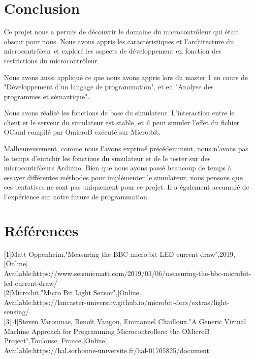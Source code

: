 \documentclass[14px]{article}
\begin{document}
	
	
	\section{Conclusion}
	Ce projet nous a permis de découvrir le domaine du microcontrôleur qui était obscur pour nous. Nous avons appris les caractéristiques et l'architecture du microcontrôleur et exploré les aspects de développement en fonction des restrictions du microcontrôleur.
	
	Nous avons aussi appliqué ce que nous avons appris lors du master 1 en cours de "Développement d'un langage de programmation", et en "Analyse des programmes et sémantique".
	
	Nous avons réalisé les fonctions de base du simulateur. L’interaction entre le client et le serveur du simulateur est stable, et il peut simuler l'effet du fichier OCaml compilé par OmicroB exécuté sur Micro:bit.
	
	Malheureusement, comme nous l'avons exprimé précédemment, nous n'avons pas le temps d'enrichir les fonctions du simulateur et de le tester sur des microcontrôleurs Arduino. Bien que nous ayons passé beaucoup de temps à essayer différentes méthodes pour implémenter le simulateur, nous pensons que ces tentatives ne sont pas uniquement pour ce projet. Il a également accumulé de l'expérience sur notre future de programmation.
	
	\section{Références}
	[1]Matt Oppenheim,"Measuring the BBC micro:bit LED current draw",2019,[Online].\\
	Available:https://www.seismicmatt.com/2019/03/06/measuring-the-bbc-microbit-led-current-draw/\\
	
	[2]Micro:bit,"Micro Bit Light Sensor",[Online].\\
	Available:https://lancaster-university.github.io/microbit-docs/extras/light-sensing/\\
	
	[3][4]Steven Varoumas, Benoît Vaugon, Emmanuel Chailloux."A Generic Virtual Machine Approach for Programming Microcontrollers: the OMicroB Project",Toulouse, France.[Online].\\
	Available:https://hal.sorbonne-universite.fr/hal-01705825/document\\
	
	
\end{document}
